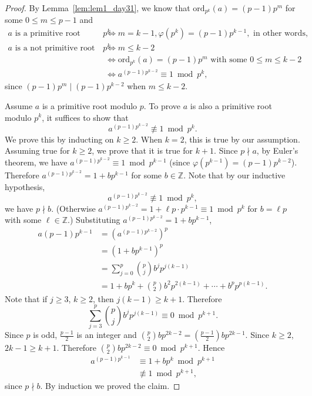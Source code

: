 \documentclass{amsbook}
\theoremstyle{plain}
\theoremstyle{definition}
\theoremstyle{remark}
\numberwithin{equation}{chapter}
\numberwithin{figure}{chapter}
\newcommand{\Z}{\mathbb{Z}}
\newcommand*{\ord}{\text{ord}}
\begin{document}
\begin{proof}
  By Lemma~\ref{lem:lem1_day31}, we know that $\ord_{p^k} (a) = (p-1)p^m$ for some $0 \leqslant m \leqslant p - 1$  and
  \begin{align}
    \text{$a$ is a primitive root modulo $p^k$} &\iff m = k - 1, \varphi (p^k) = (p - 1)p^{k-1}, \text{ in other words, } \\
    \text{$a$ is a not primitive root modulo $p^k$} &\iff m \leqslant k - 2 \\
                                                &\iff \ord_{p^k} (a) = (p - 1)p^m \text{ with some $0 \leqslant m \leqslant k - 2$} \\
                                                &\iff a^{(p-1)p^{k-2}} \equiv 1 \bmod p^k,
  \end{align}
  since $(p-1)p^m \mid (p-1)p^{k-2}$ when $m \leqslant k-2$.

  Assume $a$ is a primitive root modulo $p$. To prove $a$ is also a primitive root modulo $p^k$, it suffices to show that
  \[
    a^{(p-1)p^{k-2}} \not\equiv 1 \bmod p^k.
  \]
  We prove this by inducting on $k \geqslant 2$.
  When $k = 2$, this is true by our assumption. Assuming true for $k \geqslant 2$, we prove that it is true for $k + 1$. Since $p \nmid a$, by Euler's theorem, we have $a^{(p-1)p^{k-2}} \equiv 1 \bmod p^{k-1}$ (since $\varphi (p^{k-1}) = (p-1)p^{k-2}$). Therefore $a^{(p-1)p^{k-2}} = 1 + bp^{k-1}$ for some $b \in \Z$. Note that by our inductive hypothesis,
  \[
    a^{(p-1)p^{k-2}} \not\equiv 1 \bmod p^k,
  \]
  we have $p \nmid b$. (Otherwise $a^{(p-1)p^{k-2}} = 1 + \ell p \cdot p^{k-1} \equiv 1 \bmod p^k$ for $b = \ell p$ with some $\ell \in \Z$.)
  Substituting $a^{(p-1)p^{k-2}} = 1 + bp^{k-1}$,
  \begin{align}
    a{(p-1)p^{k-1}} &= \left( a^{(p-1)p^{k-2}} \right)^p \\
                    &= (1 + b p^{k-1})^p \\
                    &= \sum_{j = 0}^p \binom{p}{j} b^j p^{j(k-1)} \\
                    &= 1 + bp^k + \binom{p}{2} b^2 p^{2(k-1)} + \cdots + b^p p^{p(k-1)}.
  \end{align}
  Note that if $j \geqslant 3$, $k \geqslant 2$, then $j(k-1) \geqslant k + 1$. Therefore
  \[
    \sum_{j = 3}^p \binom{p}{j} b^j p^{j(k-1)} \equiv 0 \bmod p^{k+1}.
  \]
  Since $p$ is odd, $\frac{p-1}2$ is an integer and $\binom{p}2 b p^{2k - 2} = \left( \frac{p-1}2 \right) b p^{2k-1}$. Since $k \geqslant 2$, $2k - 1 \geqslant k + 1$. Therefore $\binom{p}2 b p^{2k - 2} \equiv 0 \bmod p^{k+1}$. Hence
  \begin{align}
    a^{(p-1)p^{k-1}} &\equiv 1 + b p^k \bmod p^{k+1} \\
                     &\not\equiv 1 \bmod p^{k+1},
  \end{align}
  since $p \nmid b$. By induction we proved the claim.
\end{proof}
\end{document}
